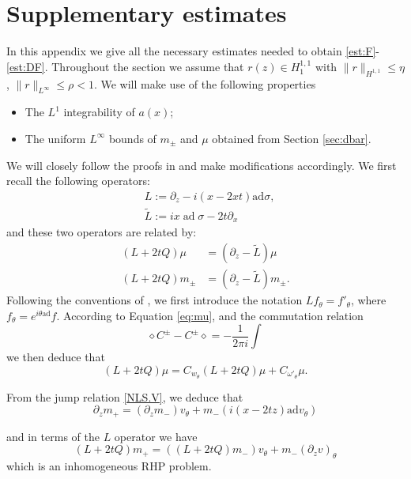 \documentclass{amsart}
\theoremstyle{plain}
\theoremstyle{remark}
\numberwithin{equation}{section}
\begin{document}
\appendix
\section{Supplementary estimates}
\label{sec:suppesti}
In this appendix we give all the necessary estimates needed to obtain \eqref{est:F}-\eqref{est:DF}. Throughout the section we assume that $r(z)\in H^{1,1}_1$ with $\|r\|_{H^{1,1}} \leqslant \eta$, $\|r\|_{L^{\infty}} \leqslant \rho<1$. We will make use of the following properties
\begin{itemize}
    \item[1.] The $L^1$ integrability of $a(x)$;
    \item[2.] The uniform $L^\infty$ bounds of $m_\pm$ and $\mu$ obtained from  Section \ref{sec:dbar}.
\end{itemize}
We will closely follow the proofs in \cite[Section 5]{DZ-2} and make modifications accordingly.
We first recall the following operators:
\begin{align}
    & L:=\partial_z - i(x-2xt) \mathrm{ad} \sigma,\\
    &\tilde{L}:=i x \operatorname{ad} \sigma-2 t \partial_x
\end{align}
and these two operators are related by:
\begin{align}
    (L+2tQ) \mu & =\left(\partial_z-\tilde{L}\right) \mu \\
    (L+2tQ) m_{ \pm} & =\left(\partial_z-\tilde{L}\right) m_{ \pm}.
\end{align}
Following the conventions of  \cite[Section 5]{DZ-2}, we first introduce the notation $Lf_\theta=f'_\theta$, where $f_\theta = e^{i\theta \mathrm{ad}}f$. According to  Equation \eqref{eq:mu}, and the commutation relation
\begin{equation}
    \diamond C^\pm -C^\pm \diamond=-\frac{1}{2\pi i}\int
\end{equation}
we then deduce that
\begin{equation}
    (L+2tQ)\mu =C_{w_\theta}(L+2 t Q) \mu + C_{\omega'_\theta} \mu.
\end{equation}

From the jump relation \eqref{NLS.V}, we deduce that
\begin{equation}
    \partial_z m_+=(\partial_z m_-)v_\theta+m_-(i(x-2tz)\mathrm{ad} v_\theta)
\end{equation}

and in terms of the $L$ operator we have
\begin{equation}
\label{eq:L2tq}
    (L+2tQ) m_+=((L+2tQ) m_-)v_\theta+m_-(\partial_z v)_\theta
\end{equation}
which is an inhomogeneous RHP problem. 
\end{document}
